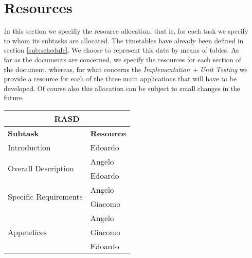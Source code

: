 \section{Resources} %
\label{sec:resources}

In this section we specifiy the resource allocation, that is, for each task we specify to whom its subtasks are allocated. The timetables have already been defined in section \ref{sub:schedule}.
We choose to represent this data by means of tables. As far as the documents are concerned, we specify the resources for each section of the document, whereas, for what concerns the \emph{Implementation + Unit Testing} we provide a resource for each of the three main applications that will have to be developed. Of course also this allocation can be subject to small changes in the future.

\begin{center}
\begin{tabular}{ |l|l| }
	\multicolumn{2}{c}{\textbf{RASD}} \\ \hline
	\textbf{Subtask} & \textbf{Resource} \\ \hline
	\multirow{1}{*}{Introduction} & Edoardo \\ \hline
	\multirow{2}{*}{Overall Description} & Angelo \\
										 & Edoardo \\ \hline
	\multirow{2}{*}{Specific Requirements} & Angelo \\
										& Giacomo \\ \hline
	\multirow{3}{*}{Appendices} & Angelo \\ 
				& Giacomo \\
				& Edoardo \\ \hline

\end{tabular}
\end{center}

\vspace* {30px}


